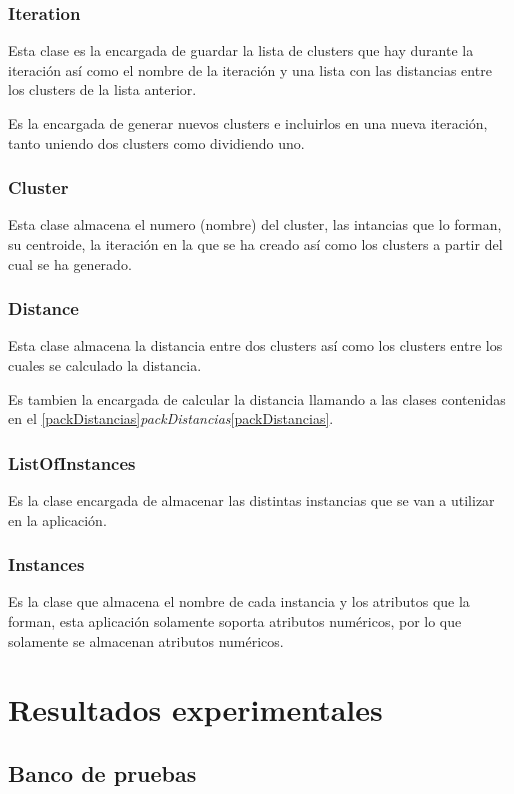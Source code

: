 \documentclass[11pt, titlepage,a4paper]{article}
\begin{document}
\subsubsection{Iteration}
Esta clase es la encargada de guardar la lista de clusters que hay durante la
iteración así como el nombre de la iteración y una lista con las distancias
entre los clusters de la lista anterior.

Es la encargada de generar nuevos clusters e incluirlos en una nueva iteración,
tanto uniendo dos clusters como dividiendo uno.

\subsubsection{Cluster}
Esta clase almacena el numero (nombre) del cluster, las intancias que lo forman,
su centroide, la iteración en la que se ha creado así como los clusters a partir
del cual se ha generado.

\subsubsection{Distance}
Esta clase almacena la distancia entre dos clusters así como los clusters entre
los cuales se calculado la distancia.

Es tambien la encargada de calcular la distancia llamando a las clases
contenidas en el
\ref{packDistancias}\textit{packDistancias}\ref{packDistancias}.

\subsubsection{ListOfInstances}
Es la clase encargada de almacenar las distintas instancias que se van a
utilizar en la aplicación.

\subsubsection{Instances}
Es la clase que almacena el nombre de cada instancia y los atributos que la
forman, esta aplicación solamente soporta atributos numéricos, por lo que
solamente se almacenan atributos numéricos.

\section{Resultados experimentales}

\subsection{Banco de pruebas}
\end{document}

